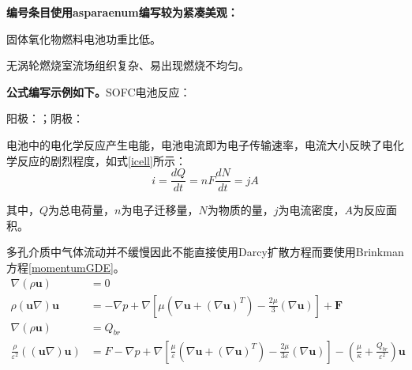 \label{chap:sample}
\textbf{\color{blue}编号条目使用asparaenum编写较为紧凑美观：}
\begin{asparaenum}[1)]
	\item 固体氧化物燃料电池功重比低。
	\item 无涡轮燃烧室流场组织复杂、易出现燃烧不均匀。
\end{asparaenum}

\textbf{\color{blue}公式编写示例如下。}SOFC电池反应\cite{Fu2021}：
\begin{center}
	阳极：；阴极：
\end{center}

电池中的电化学反应产生电能，电池电流即为电子传输速率，电流大小反映了电化学反应的剧烈程度，如式\eqref{icell}所示：
\begin{equation}
	i=\frac{dQ}{dt}=nF\frac{dN}{dt}=jA
	\label{icell}
\end{equation}

其中，$Q$为总电荷量，$n$为电子迁移量，$N$为物质的量，$j$为电流密度，$A$为反应面积。

多孔介质中气体流动并不缓慢因此不能直接使用Darcy扩散方程而要使用Brinkman方程\eqref{momentumGDE}\cite{Chellehbari2021,Celik2018}。
\begin{align}
	\nabla\left(\rho\textbf{u}\right)&=0\label{mass}\\
	\rho(\textbf{u}\nabla)\textbf{u}&=
	-\nabla p
	+\nabla\left[\mu\left(\nabla \textbf{u}+(\nabla \textbf{u})^{T}\right)-\frac{2\mu}{3}\left(\nabla{\textbf{u}}\right)\right]
	+\textbf{F}\label{momentum}\\
	\nabla(\rho{\textbf{u}})&=Q_{br}\label{massGDE}\\
	\frac{\rho}{\varepsilon^2}\left(\left(\textbf{u} \nabla\right)\textbf{u}\right)&={F}-\nabla{p}+
	\nabla\left[\frac{\mu}{\varepsilon}\left(\nabla{\textbf{u}}
	+\left(\nabla{\textbf{u}}\right)^{T}\right)
	-\frac{2\mu}{3\varepsilon}\left(\nabla{\textbf{u}}\right)\right]
	-\left(\frac{\mu}{\kappa}+
	\frac{Q_{br}}{\varepsilon^{2}}\right)\textbf{u}\label{momentumGDE}
\end{align}

